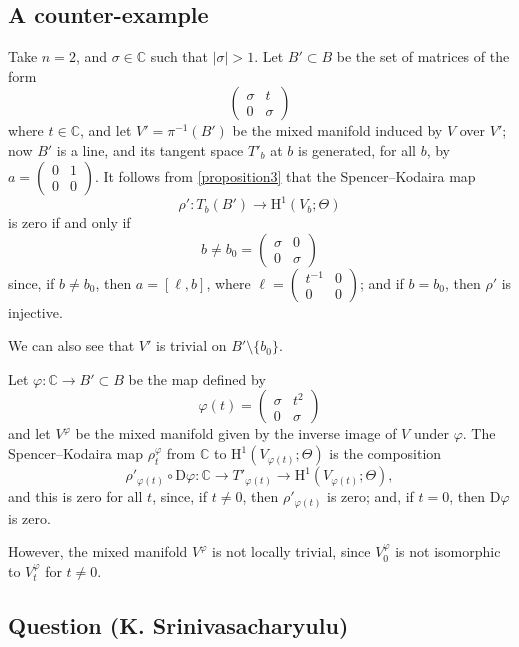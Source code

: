 \documentclass{article}
\theoremstyle{plain}
\theoremstyle{definition}
\newcommand{\CC}{\mathbb{C}}
\newcommand{\DD}{\mathrm{D}}
\newcommand{\HH}{\mathrm{H}}
\newcommand{\oldpage}[1]{\marginpar{\footnotesize$\Big\vert$ \textit{p.~#1}}}
\begin{document}
\subsection{A counter-example}
\label{III.4}

Take $n=2$, and $\sigma\in\CC$ such that $|\sigma|>1$.
Let $B'\subset B$ be the set of matrices of the form
\[
  \begin{pmatrix}
    \sigma & t
  \\0 & \sigma
  \end{pmatrix}
\]
where $t\in\CC$, and let $V'=\pi^{-1}(B')$ be the mixed manifold induced by $V$ over $V'$;
now $B'$ is a line, and its tangent space $T'_b$ at $b$ is generated, for all $b$, by $a=\begin{pmatrix}0&1\\0&0\end{pmatrix}$.
It follows from \cref{proposition3} that the Spencer--Kodaira map
\[
  \rho'\colon T_b(B') \to \HH^1(V_b;\Theta)
\]
is zero if and only if
\[
  b \neq b_0 =
  \begin{pmatrix}
    \sigma & 0
  \\0 & \sigma
  \end{pmatrix}
\]
since, if $b\neq b_0$, then $a=[\ell,b]$, where $\ell=\begin{pmatrix}t^{-1}&0\\0&0\end{pmatrix}$; and if $b=b_0$, then $\rho'$ is injective.

We can also see that $V'$ is trivial on $B'\setminus\{b_0\}$.

Let $\varphi\colon\CC\to B'\subset B$ be the map defined by
\[
  \varphi(t) =
  \begin{pmatrix}
    \sigma & t^2
  \\0 & \sigma
  \end{pmatrix}
\]
and let $V^\varphi$ be the mixed manifold given by the inverse image of $V$ under $\varphi$.
The Spencer--Kodaira map $\rho_t^\varphi$ from $\CC$ to $\HH^1(V_{\varphi(t)};\Theta)$ is the composition
\oldpage{3-08}
\[
  \rho'_{\varphi(t)}\circ\DD\varphi\colon
  \CC
  \to T'_{\varphi(t)}
  \to \HH^1(V_{\varphi(t)};\Theta),
\]
and this is zero for all $t$, since, if $t\neq0$, then $\rho'_{\varphi(t)}$ is zero; and, if $t=0$, then $\DD\varphi$ is zero.

However, the mixed manifold $V^\varphi$ is not locally trivial, since $V_0^\varphi$ is not isomorphic to $V_t^\varphi$ for $t\neq0$.


\subsection{Question (K. Srinivasacharyulu)}
\label{III.5}
\end{document}
